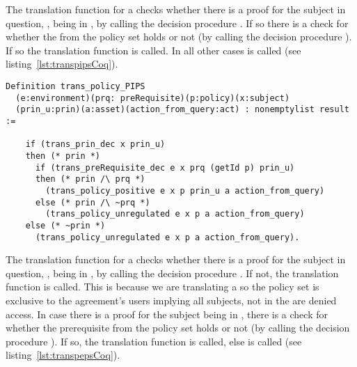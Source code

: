 The  translation function for a  checks whether there is a proof for the subject in question, , being in , by calling the decision procedure . If so there is a check for whether the  from the policy set holds or not (by calling the decision procedure ). If so the translation function  is called. In all other cases  is called (see listing~\ref{lst:transpipsCoq}).

\begin{lstlisting}
Definition trans_policy_PIPS
  (e:environment)(prq: preRequisite)(p:policy)(x:subject)
  (prin_u:prin)(a:asset)(action_from_query:act) : nonemptylist result :=
  
    if (trans_prin_dec x prin_u)
    then (* prin *)
      if (trans_preRequisite_dec e x prq (getId p) prin_u)
      then (* prin /\ prq *)
        (trans_policy_positive e x p prin_u a action_from_query)                           
      else (* prin /\ ~prq *)
        (trans_policy_unregulated e x p a action_from_query)
    else (* ~prin *)
      (trans_policy_unregulated e x p a action_from_query).
\end{lstlisting}


The  translation function for a  checks whether there is a proof for the subject in question, , being in , by calling the decision procedure . If not, the translation function  is called. This is because we are translating a  so the policy set is exclusive to the agreement's users implying all subjects, not in the  are denied access. In case there is a proof for the subject  being in , there is a check for whether the prerequisite from the policy set holds or not (by calling the decision procedure ). If so, the translation function  is called, else  is called (see listing~\ref{lst:transpepsCoq}).

